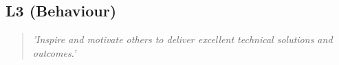 \subsection*{L3 (Behaviour)}

  \begin{quote}
    \textit{'Inspire and motivate others to deliver
    excellent technical solutions and outcomes.'}
  \end{quote}

\newpage
